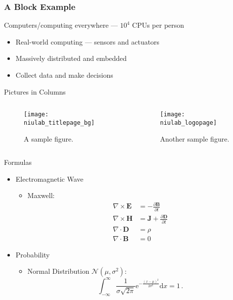 \documentclass[usepdftitle=false,onlycurpagenum,secheader]{beamer}
\begin{document}
\begin{frame}
  \frametitle{A Block Example}
  \begin{block}{Computers/computing everywhere --- $10^4$ CPUs per person}
    \begin{itemize}
      \item Real-world computing --- sensors and actuators
      \item Massively distributed and embedded
      \item Collect data and make decisions
    \end{itemize}
  \end{block}
\end{frame}

\begin{frame}{Pictures in Columns}
  \begin{columns}
    \begin{column}{.5\textwidth}
      \begin{figure}[htbp]
        \centering
        \texttt{[image: niulab\_titlepage\_bg]}
        \caption{A sample figure.}
      \end{figure}
    \end{column}
    \begin{column}{.5\textwidth}
      \begin{figure}[htbp]
        \centering
        \texttt{[image: niulab\_logopage]}
        \caption{Another sample figure.}
      \end{figure}
    \end{column}
  \end{columns}
\end{frame}

\begin{frame}{Formulas}
  \begin{itemize}
    \item Electromagnetic Wave
      \begin{itemize}
        \item Maxwell:
          \begin{align}
            \nabla \times \mathbf{E} & = - \frac{\partial
            \mathbf{B}}{\partial t}\\
            \nabla \times \mathbf{H} & = \mathbf{J} +
            \frac{\partial \mathbf{D}}{\partial t}\\
            \nabla \cdot \mathbf{D} & = \rho \\
            \nabla \cdot\mathbf{B} & = 0
            \label{eqn:maxwell}
          \end{align}
      \end{itemize}
    \item Probability
      \begin{itemize}
        \item Normal Distribution $\mathcal{N}(\mu,\sigma^2)$:
          \[
          \int_{-\infty}^{\infty}\frac{1}{\sigma\sqrt{2\pi}}\mathrm{e}^{-\frac{(x-\mu)^2}{2\sigma^2}}\mathrm{d}x= 1 \, .
          \]
      \end{itemize}
  \end{itemize}
\end{frame}
\end{document}
